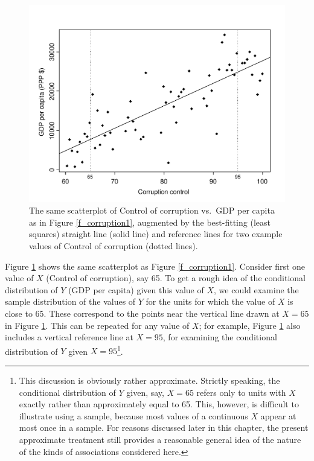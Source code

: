 \begin{figure}[t]
\caption{
The same scatterplot of Control of corruption vs.\ GDP per capita as in
Figure \ref{f_corruption1}, augmented by the best-fitting (least
squares) straight line (solid line) and reference lines
for two example values of Control of corruption (dotted lines).}
\label{f_corruption2}
\vspace*{-3ex}
\includegraphics[width=13.5cm]{corruption2}
\vspace*{-2ex}
\end{figure}

Figure \ref{f_corruption2} shows the same scatterplot as Figure
\ref{f_corruption1}. Consider first one value of $X$ (Control of
corruption), say 65. To get a rough idea of the conditional distribution
of $Y$ (GDP per capita) given this value of $X$, we could examine the
sample distribution of the values of $Y$ for the units for which the
value of $X$ is close to 65. These correspond to the points near the
vertical line drawn at $X=65$ in Figure \ref{f_corruption2}. This can
be repeated for any value of $X$; for example, Figure
\ref{f_corruption2} also includes a vertical reference line at $X=95$,
for examining the conditional distribution of $Y$ given
$X=95$\footnote{This discussion is obviously rather approximate.
Strictly speaking, the conditional distribution of $Y$ given, say,
$X=65$ refers only to units with $X$ exactly rather than approximately
equal to 65. This, however, is difficult to illustrate using a sample,
because most values of a continuous $X$ appear at most once in a sample.
For reasons discussed later in this chapter, the present approximate
treatment still provides a reasonable general idea of the nature of the
kinds of associations considered here.}.

